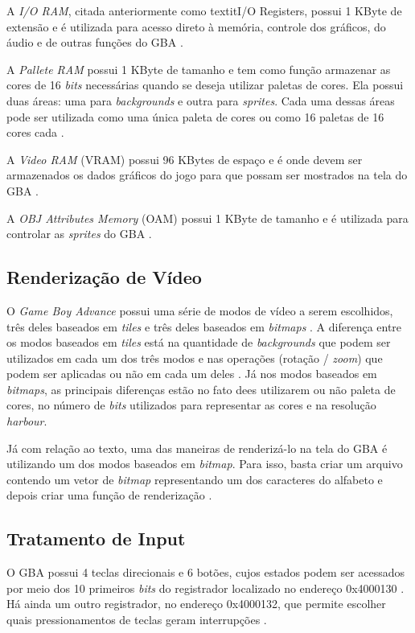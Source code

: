 A \textit{I/O RAM}, citada anteriormente como textit{I/O Registers}, possui 1 KByte de extensão e é utilizada para acesso direto à memória, controle dos gráficos, do áudio e de outras funções do GBA \cite{cowbite}.

A \textit{Pallete RAM} possui 1 KByte de tamanho e tem como função armazenar as cores de 16 \textit{bits} necessárias quando se deseja utilizar paletas de cores. Ela possui duas áreas: uma para \textit{backgrounds} e outra para \textit{sprites}. Cada uma dessas áreas pode ser utilizada como uma única paleta de cores ou como 16 paletas de 16 cores cada \cite{cowbite}.

A \textit{Video RAM} (VRAM) possui 96 KBytes de espaço e é onde devem ser armazenados os dados gráficos do jogo para que possam ser mostrados na tela do GBA \cite{cowbite}.

A \textit{OBJ Attributes Memory} (OAM) possui 1 KByte de tamanho e é utilizada para controlar as \textit{sprites} do GBA \cite{cowbite}.

\subsection{Renderização de Vídeo}

O \textit{Game Boy Advance} possui uma série de modos de vídeo a serem escolhidos, três deles baseados em \textit{tiles} e três deles baseados em \textit{bitmaps} \cite{harbour}. A diferença entre os modos baseados em \textit{tiles} está na quantidade de \textit{backgrounds} que podem ser utilizados em cada um dos três modos e nas operações (rotação / \textit{zoom}) que podem ser aplicadas ou não em cada um deles \cite{harbour}. Já nos modos baseados em \textit{bitmaps}, as principais diferenças estão no fato dees utilizarem ou não paleta de cores, no número de \textit{bits} utilizados para representar as cores e na resolução \textit{harbour}.

Já com relação ao texto, uma das maneiras de renderizá-lo na tela do GBA é utilizando um dos modos baseados em \textit{bitmap}. Para isso, basta criar um arquivo contendo um vetor de \textit{bitmap} representando um dos caracteres do alfabeto e depois criar uma função de renderização \cite{harbour}.

\subsection{Tratamento de Input}

O GBA possui 4 teclas direcionais e 6 botões, cujos estados podem ser acessados por meio dos 10 primeiros \textit{bits} do registrador localizado no endereço 0x4000130 \cite{gbatek}. Há ainda um outro registrador, no endereço 0x4000132, que permite escolher quais pressionamentos de teclas geram interrupções \cite{cowbite}.

